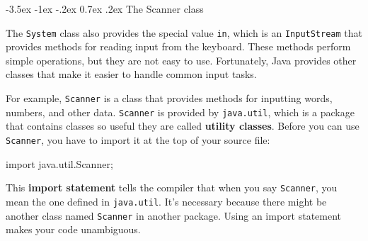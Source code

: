 \documentclass[12pt]{book}
\makeatletter
\theoremstyle{exercise}
\newcommand{\java}[1]{\verb"#1"}
\renewcommand{\section}{\@startsection{section}{1}{\z@}%
    {-3.5ex \@plus -1ex \@minus -.2ex}%
    {0.7ex \@plus.2ex}%
    {\normalfont\Large\bfseries}}
\newcommand{\java}[1]{\lstinline{#1}} %
\makeatother
\begin{document}



\section{The Scanner class}
\label{scanner}

%

The \java{System} class also provides the special value \java{in}, which is an \java{InputStream} that provides methods for reading input from the keyboard.
These methods perform simple operations, but they are not easy to use.
Fortunately, Java provides other classes that make it easier to handle common input tasks.


For example, \java{Scanner} is a class that provides methods for inputting words, numbers, and other data.
\java{Scanner} is provided by \java{java.util}, which is a package that contains classes so useful they are called {\bf utility classes}.
Before you can use \java{Scanner}, you have to import it at the top of your source file:

\begin{code}
import java.util.Scanner;
\end{code}


This {\bf import statement} tells the compiler that when you say \java{Scanner}, you mean the one defined in \java{java.util}.
It's necessary because there might be another class named \java{Scanner} in another package.
Using an import statement makes your code unambiguous.
\end{document}
